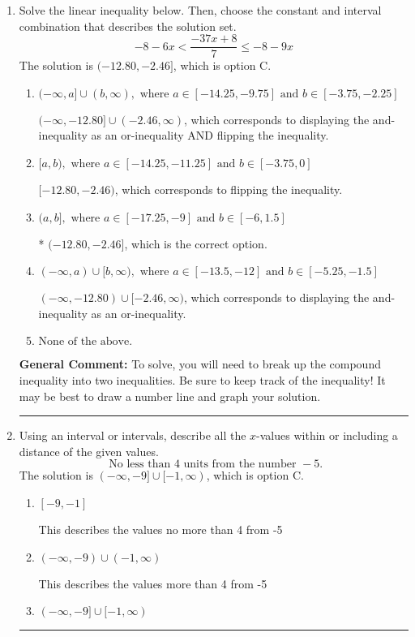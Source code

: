 \documentclass{extbook}[14pt]
\newcommand{\litem}[1]{\item #1

\rule{\textwidth}{0.4pt}}
\begin{document}
\begin{enumerate}\litem{
Solve the linear inequality below. Then, choose the constant and interval combination that describes the solution set.
\[ -8 - 6 x < \frac{-37 x + 8}{7} \leq -8 - 9 x \]The solution is \( (-12.80, -2.46] \), which is option C.\begin{enumerate}[label=\Alph*.]
\item \( (-\infty, a] \cup (b, \infty), \text{ where } a \in [-14.25, -9.75] \text{ and } b \in [-3.75, -2.25] \)

$(-\infty, -12.80] \cup (-2.46, \infty)$, which corresponds to displaying the and-inequality as an or-inequality AND flipping the inequality.
\item \( [a, b), \text{ where } a \in [-14.25, -11.25] \text{ and } b \in [-3.75, 0] \)

$[-12.80, -2.46)$, which corresponds to flipping the inequality.
\item \( (a, b], \text{ where } a \in [-17.25, -9] \text{ and } b \in [-6, 1.5] \)

* $(-12.80, -2.46]$, which is the correct option.
\item \( (-\infty, a) \cup [b, \infty), \text{ where } a \in [-13.5, -12] \text{ and } b \in [-5.25, -1.5] \)

$(-\infty, -12.80) \cup [-2.46, \infty)$, which corresponds to displaying the and-inequality as an or-inequality.
\item \( \text{None of the above.} \)


\end{enumerate}

\textbf{General Comment:} To solve, you will need to break up the compound inequality into two inequalities. Be sure to keep track of the inequality! It may be best to draw a number line and graph your solution.
}
\litem{
Using an interval or intervals, describe all the $x$-values within or including a distance of the given values.
\[ \text{ No less than } 4 \text{ units from the number } -5. \]The solution is \( (-\infty, -9] \cup [-1, \infty) \), which is option C.\begin{enumerate}[label=\Alph*.]
\item \( [-9, -1] \)

This describes the values no more than 4 from -5
\item \( (-\infty, -9) \cup (-1, \infty) \)

This describes the values more than 4 from -5
\item \( (-\infty, -9] \cup [-1, \infty) \)


\end{enumerate}}
\end{enumerate}
\end{document}
